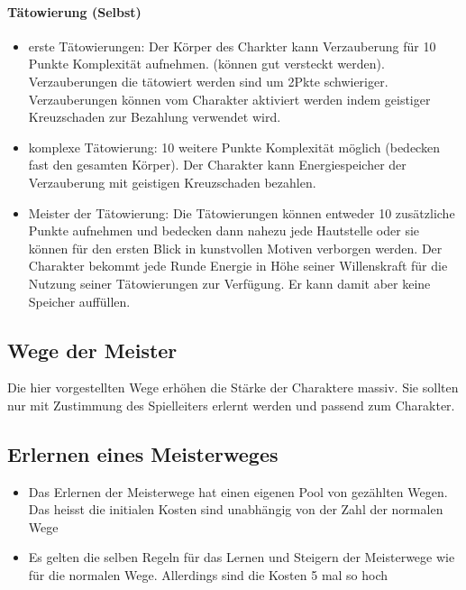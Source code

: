 \documentclass{article}
\begin{document}
\paragraph{Tätowierung (Selbst)}

\begin{itemize}
\item erste Tätowierungen: Der Körper des Charkter kann Verzauberung für 10 Punkte Komplexität aufnehmen. (können gut versteckt werden). Verzauberungen die tätowiert werden sind um 2Pkte schwieriger. Verzauberungen können vom Charakter aktiviert werden indem geistiger Kreuzschaden zur Bezahlung verwendet wird.
\item komplexe Tätowierung: 10 weitere Punkte Komplexität möglich (bedecken fast den gesamten Körper). Der Charakter kann Energiespeicher der Verzauberung mit geistigen Kreuzschaden bezahlen.
\item Meister der Tätowierung: Die Tätowierungen können entweder 10 zusätzliche Punkte aufnehmen und bedecken dann nahezu jede Hautstelle oder sie können für den ersten Blick in kunstvollen Motiven verborgen werden. Der Charakter bekommt jede Runde Energie in Höhe seiner Willenskraft für die Nutzung seiner Tätowierungen zur Verfügung. Er kann damit aber keine Speicher auffüllen.
\end{itemize}

\begin{center}
\section{Wege der Meister}
\end{center}

Die hier vorgestellten Wege erhöhen die Stärke der Charaktere massiv. Sie sollten nur mit Zustimmung des Spielleiters
erlernt werden und passend zum Charakter.

\begin{center}
\subsection{Erlernen eines Meisterweges}
\end{center}

\begin{itemize}
\item Das Erlernen der Meisterwege hat einen eigenen Pool von gezählten Wegen. Das heisst die initialen Kosten sind unabhängig von der Zahl der normalen Wege
\item Es gelten die selben Regeln für das Lernen und Steigern der Meisterwege wie für die normalen Wege. Allerdings sind die Kosten 5 mal so hoch
\end{itemize}
\end{document}
